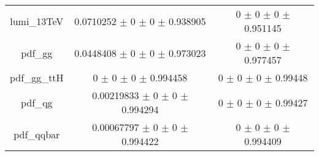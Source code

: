 \begin{table}
\begin{tabular}{ccc}
lumi\_13TeV & \num{0.0710252} $\pm$ \num{0} $\pm$ \num{0} $\pm$ \num{0.938905} & \num{0} $\pm$ \num{0} $\pm$ \num{0} $\pm$ \num{0.951145}\\
pdf\_gg & \num{0.0448408} $\pm$ \num{0} $\pm$ \num{0} $\pm$ \num{0.973023} & \num{0} $\pm$ \num{0} $\pm$ \num{0} $\pm$ \num{0.977457}\\
pdf\_gg\_ttH & \num{0} $\pm$ \num{0} $\pm$ \num{0} $\pm$ \num{0.994458} & \num{0} $\pm$ \num{0} $\pm$ \num{0} $\pm$ \num{0.99448}\\
pdf\_qg & \num{0.00219833} $\pm$ \num{0} $\pm$ \num{0} $\pm$ \num{0.994294} & \num{0} $\pm$ \num{0} $\pm$ \num{0} $\pm$ \num{0.99427}\\
pdf\_qqbar & \num{0.00067797} $\pm$ \num{0} $\pm$ \num{0} $\pm$ \num{0.994422} & \num{0} $\pm$ \num{0} $\pm$ \num{0} $\pm$ \num{0.994409}\\
\bottomrule
\end{tabular}
\end{table}